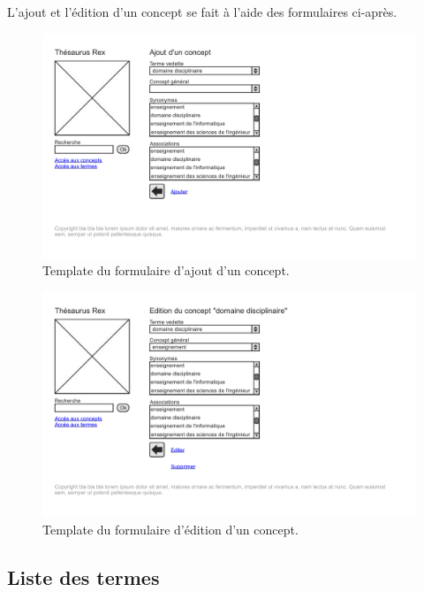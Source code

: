 L'ajout et l'édition d'un concept se fait à l'aide des formulaires ci-après.
\begin{figure}[H]
\begin{center}
\includegraphics[width=\textwidth]{files/template_concept_add}
\end{center}
\caption{Template du formulaire d'ajout d'un concept.}
\end{figure}
\begin{figure}[H]
\begin{center}
\includegraphics[width=\textwidth]{files/template_concept_edit}
\end{center}
\caption{Template du formulaire d’édition d'un concept.}
\end{figure}

\subsection{Liste des termes}

